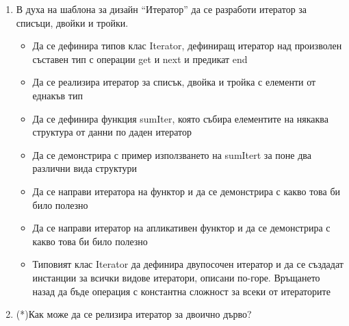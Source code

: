 \begin{enumerate}[]
	\item В духа на шаблона за дизайн ``Итератор'' да се разработи итератор за списъци, двойки и тройки.
	\begin{itemize}
		\item Да се дефинира типов клас Iterator, дефиниращ итератор над произволен съставен тип с операции get и next и предикат end
		\item Да се реализира итератор за списък, двойка и тройка с елементи от еднакъв тип
		\item Да се дефинира функция sumIter, която събира елементите на някаква структура от данни по даден итератор
		\item Да се демонстрира с пример използването на sumItert за поне два различни вида структури
		\item Да се направи итератора на функтор и да се демонстрира с какво това би било полезно
		\item Да се направи итератор на апликативен функтор и да се демонстрира с какво това би било полезно
		\item Типовият клас Iterator да дефинира двупосочен итератор и да се създадат инстанции за всички видове итератори, описани по-горе. Връщането назад да бъде операция с константна сложност за всеки от итераторите
	\end{itemize}

	\item (*)Как може да се релизира итератор за двоично дърво?
\end{enumerate}


